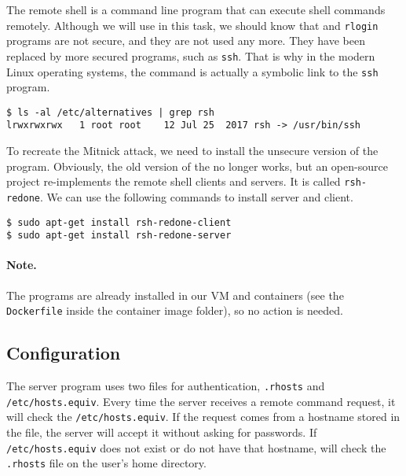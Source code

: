 The remote shell \rsh is a command line program that can execute shell commands
remotely. Although we will use \rsh in this task, we should know that 
\rsh and \texttt{rlogin} programs are not secure, and they 
are not used any more. They have been replaced by
more secured programs, such as \texttt{ssh}.   
That is why in the modern Linux operating systems, the \rsh command 
is actually a symbolic link to the \texttt{ssh} program. 

\begin{lstlisting}
$ ls -al /etc/alternatives | grep rsh
lrwxrwxrwx   1 root root    12 Jul 25  2017 rsh -> /usr/bin/ssh
\end{lstlisting}



To recreate the Mitnick attack, we need to install the unsecure version
of the \rsh program. Obviously, the old version of 
the \rsh no longer works, but an open-source project
re-implements the remote shell clients and servers. 
It is called \texttt{rsh-redone}. 
We can use the following commands to install \rsh server and client. 

\begin{lstlisting}
$ sudo apt-get install rsh-redone-client
$ sudo apt-get install rsh-redone-server
\end{lstlisting}

\paragraph{Note.} The \rsh programs are already installed in our 
VM and containers (see the \texttt{Dockerfile} inside the container image
folder), so no action is needed. 



\subsection{Configuration}
\label{subsec:configuration}

The \rsh server program uses two files for authentication, 
\texttt{.rhosts} and \texttt{/etc/hosts.equiv}.
Every time the server receives a remote command request, it will check
the \texttt{/etc/hosts.equiv}. If the request comes from a hostname stored in the file, the
server will accept it without asking for passwords. 
If \texttt{/etc/hosts.equiv} does not exist or
do not have that hostname, \rsh  will check the \texttt{.rhosts} file 
on the user's home directory. 

